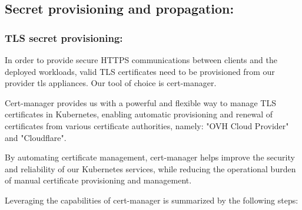 \subsection{Secret provisioning and propagation:}

\subsubsection{TLS secret provisioning:}

In order to provide secure HTTPS communications between clients and the deployed workloads, valid TLS certificates need to be provisioned from our provider tls appliances. Our tool of choice is cert-manager.

Cert-manager provides us with a powerful and flexible way to manage TLS certificates in Kubernetes, enabling automatic provisioning and renewal of certificates from various certificate authorities, namely: "OVH Cloud Provider" and "Cloudflare".

By automating certificate management, cert-manager helps improve the security and reliability of our Kubernetes services, while reducing the operational burden of manual certificate provisioning and management.

Leveraging the capabilities of cert-manager is summarized by the following steps:

